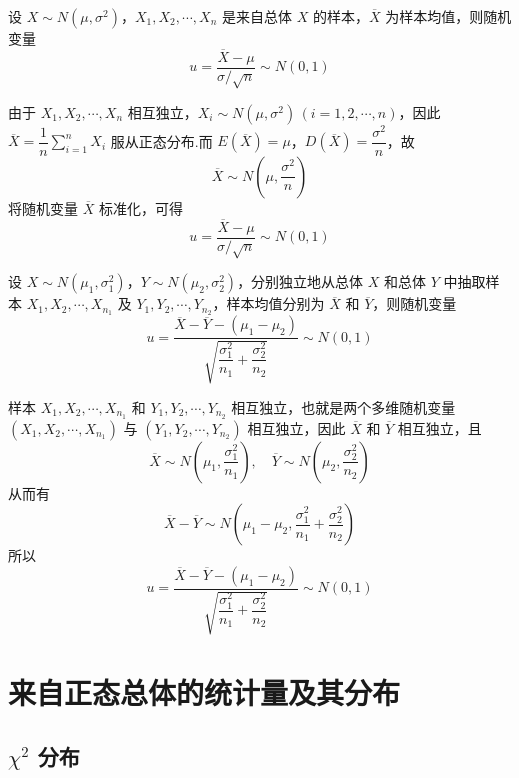 \begin{theorem}
    设 $X \sim N(\mu, \sigma^2)$，$X_1, X_2, \cdots, X_n$ 是来自总体 $X$ 的样本，$\overline{X}$ 为样本均值，则随机变量
    $$
    u = \dfrac{\overline{X} - \mu}{\sigma / \sqrt{n}} \sim N(0,1)
    $$
\end{theorem}

\begin{myproof}
    由于 $X_1, X_2, \cdots, X_n$ 相互独立，$X_i \sim N(\mu, \sigma^2) \, (i=1,2,\cdots,n)$，因此 $\overline{X} = \dfrac{1}{n} \displaystyle\sum_{i=1}^n X_i$ 服从正态分布.而 $E(\overline{X}) = \mu$，$D(\overline{X}) = \dfrac{\sigma^2}{n}$，故
    $$
    \overline{X} \sim N(\mu, \dfrac{\sigma^2}{n})
    $$
    将随机变量 $\overline{X}$ 标准化，可得
    $$
    u = \dfrac{\overline{X} - \mu}{\sigma / \sqrt{n}} \sim N(0,1)
    $$
\end{myproof}

\begin{theorem}
    设 $X \sim N(\mu_1, \sigma_1^2)$，$Y \sim N(\mu_2, \sigma_2^2)$，分别独立地从总体 $X$ 和总体 $Y$ 中抽取样本 $X_1, X_2, \cdots, X_{n_1}$ 及 $Y_1, Y_2, \cdots, Y_{n_2}$，样本均值分别为 $\overline{X}$ 和 $\overline{Y}$，则随机变量
    $$
    u = \dfrac{\overline{X} - \overline{Y} - (\mu_1 - \mu_2)}{\sqrt{\dfrac{\sigma_1^2}{n_1} + \dfrac{\sigma_2^2}{n_2}}} \sim N(0,1)
    $$
\end{theorem}

\begin{myproof}
    样本 $X_1, X_2, \cdots, X_{n_1}$ 和 $Y_1, Y_2, \cdots, Y_{n_2}$ 相互独立，也就是两个多维随机变量 $(X_1, X_2, \cdots, X_{n_1})$ 与 $(Y_1, Y_2, \cdots, Y_{n_2})$ 相互独立，因此 $\overline{X}$ 和 $\overline{Y}$ 相互独立，且
    $$
    \overline{X} \sim N(\mu_1, \dfrac{\sigma_1^2}{n_1}), \quad \overline{Y} \sim N(\mu_2, \dfrac{\sigma_2^2}{n_2})
    $$
    从而有
    $$
    \overline{X} - \overline{Y} \sim N(\mu_1 - \mu_2, \dfrac{\sigma_1^2}{n_1} + \dfrac{\sigma_2^2}{n_2})
    $$
    所以
    $$
    u = \dfrac{\overline{X} - \overline{Y} - (\mu_1 - \mu_2)}{\sqrt{\dfrac{\sigma_1^2}{n_1} + \dfrac{\sigma_2^2}{n_2}}} \sim N(0,1)
    $$
\end{myproof}

\section{来自正态总体的统计量及其分布}

\subsection{\texorpdfstring{$\chi^2$}{} 分布}

